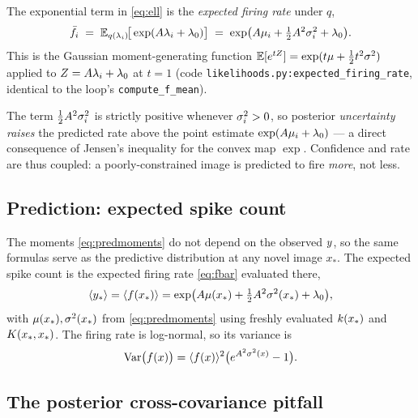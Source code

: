 The exponential term in \eqref{eq:ell} is the \emph{expected firing rate} under
$q$,
\begin{equation}
  \bar{f}_i \;=\; \mathbb{E}_{q(\lambda_i)}\!\big[\exp(A\lambda_i+\lambda_{0})\big]
    \;=\; \exp\!\big(A\mu_i+\tfrac12A^2\sigma^{2}_i+\lambda_{0}\big).
  \label{eq:fbar}
\end{equation}
This is the Gaussian moment-generating function
$\mathbb{E}[e^{tZ}]=\exp(t\mu+\tfrac12 t^2\sigma^2)$ applied to $Z=A\lambda_i+\lambda_{0}$ at
$t=1$ (code \texttt{likelihoods.py:\allowbreak expected\_firing\_rate}, identical to the
loop's \texttt{compute\_f\_mean}).

\begin{remark}
The term $\tfrac12A^2\sigma^{2}_i$ is strictly positive whenever $\sigma^{2}_i>0$, so
posterior \emph{uncertainty raises} the predicted rate above the point estimate
$\exp(A\mu_i+\lambda_{0})$ --- a direct consequence of Jensen's inequality for
the convex map $\exp$. Confidence and rate are thus coupled: a poorly-constrained
image is predicted to fire \emph{more}, not less.
\end{remark}

\subsection{Prediction: expected spike count}\label{sec:prediction}

The moments \eqref{eq:predmoments} do not depend on the observed $y$, so the
same formulas serve as the predictive distribution at any novel image $x_\ast$.
The expected spike count is the expected firing rate \eqref{eq:fbar} evaluated
there,
\begin{equation}
  \langle y_\ast\rangle=\langle f(x_\ast)\rangle
    =\exp\!\big(A\mu(x_\ast)+\tfrac12A^2\sigma^{2}(x_\ast)+\lambda_{0}\big),
\end{equation}
with $\mu(x_\ast),\sigma^{2}(x_\ast)$ from \eqref{eq:predmoments} using freshly
evaluated $k(x_\ast)$ and $K(x_\ast,x_\ast)$. The firing rate is
log-normal, so its variance is
\begin{equation}
  \operatorname{Var}\!\big(f(x)\big)
    =\langle f(x)\rangle^2\big(e^{A^2\sigma^{2}(x)}-1\big).
  \label{eq:fvar}
\end{equation}

\subsection{The posterior cross-covariance pitfall}\label{sec:crosscov}

